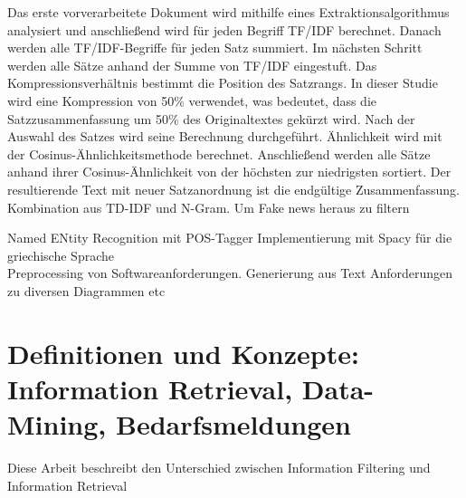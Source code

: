 Das erste vorverarbeitete Dokument wird mithilfe eines Extraktionsalgorithmus
analysiert und anschließend wird für jeden Begriff TF/IDF berechnet.
Danach werden alle TF/IDF-Begriffe für jeden Satz summiert.
Im nächsten Schritt werden alle Sätze anhand der Summe von TF/IDF eingestuft.
Das Kompressionsverhältnis bestimmt die Position des Satzrangs. In dieser Studie wird eine Kompression von 50\% verwendet, was bedeutet,
dass die Satzzusammenfassung um 50\% des Originaltextes gekürzt wird. Nach der Auswahl des Satzes wird seine Berechnung durchgeführt.
Ähnlichkeit wird mit der Cosinus-Ähnlichkeitsmethode berechnet. 
Anschließend werden alle Sätze anhand ihrer Cosinus-Ähnlichkeit von der höchsten zur niedrigsten sortiert.
Der resultierende Text mit
neuer Satzanordnung ist die endgültige Zusammenfassung.\cite{darmawan2015hybrid}\\


Kombination aus TD-IDF und N-Gram. Um Fake news heraus zu filtern\cite{suhasini2021hybrid}

Named ENtity Recognition mit POS-Tagger Implementierung mit Spacy für die griechische Sprache\cite{partalidou2019design}\\

Preprocessing von Softwareanforderungen. Generierung aus Text Anforderungen zu diversen Diagrammen etc \cite{kroha2000preprocessing}

\section{Definitionen und Konzepte: Information Retrieval, Data-Mining, Bedarfsmeldungen}
\label{sec:definitionen-konzepte}

Diese Arbeit beschreibt den Unterschied zwischen Information Filtering und Information Retrieval\cite{belkin1992information}

\newpage





